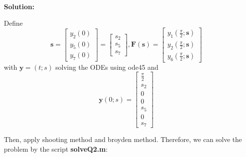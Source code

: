 \documentclass{article}
\begin{document}


\textbf{Solution:} 

Define  $$
\mathbf{s}=\left[\begin{array}{l}
	y_{2}(0) \\
	y_{5}(0) \\
	y_{7}(0)
\end{array}\right]=\left[\begin{array}{l}
s_2 \\
s_5 \\
s_7
\end{array}\right], \mathbf{F}(\mathbf{s})=\left[\begin{array}{l}
	y_{1}\left(\frac{\pi}{2} ; \mathbf{s}\right) \\
	y_{2}\left(\frac{\pi}{2} ; \mathbf{s}\right) \\
	y_{6}\left(\frac{\pi}{2} ; \mathbf{s}\right)
\end{array}\right]
$$ with $\mathbf{y}=(t;s)$ solving the ODEs using ode45 and $$
\mathbf{y}(0 ; s)=\left[\begin{array}{c}
	\frac{\pi}{2} \\
	s_{2} \\
	0 \\
	0 \\
	s_{5} \\
	0 \\
	s_{7}
\end{array}\right]
$$



Then, apply shooting method and broyden method. Therefore, we can solve the problem by the script \textbf{solveQ2.m}:
\end{document}
